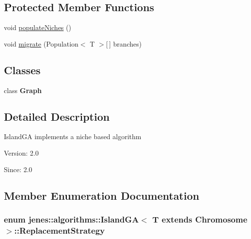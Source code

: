 \subsection*{Protected Member Functions}
\begin{CompactItemize}
\item 
void \hyperlink{classjenes_1_1algorithms_1_1_island_g_a_3_01_t_01extends_01_chromosome_01_4_fdd01d6051280db25af39a8382a48239}{populateNiches} ()
\item 
void \hyperlink{classjenes_1_1algorithms_1_1_island_g_a_3_01_t_01extends_01_chromosome_01_4_73312f19002cfeb0daf1f66e4eeccbd9}{migrate} (Population$<$ T $>$\mbox{[}$\,$\mbox{]} branches)
\end{CompactItemize}
\subsection*{Classes}
\begin{CompactItemize}
\item 
class \textbf{Graph}
\end{CompactItemize}


\subsection{Detailed Description}
IslandGA implements a niche based algorithm

\begin{Desc}
\item[Version:]2.0 \end{Desc}
\begin{Desc}
\item[Since:]2.0 \end{Desc}


\subsection{Member Enumeration Documentation}
\hypertarget{classjenes_1_1algorithms_1_1_island_g_a_3_01_t_01extends_01_chromosome_01_4_eb0e7c4ddd30e9472cfd2a280544ff51}{
\subsubsection[ReplacementStrategy]{\setlength{\rightskip}{0pt plus 5cm}enum jenes::algorithms::IslandGA$<$ T extends Chromosome $>$::{\bf ReplacementStrategy}}}
\label{classjenes_1_1algorithms_1_1_island_g_a_3_01_t_01extends_01_chromosome_01_4_eb0e7c4ddd30e9472cfd2a280544ff51}


